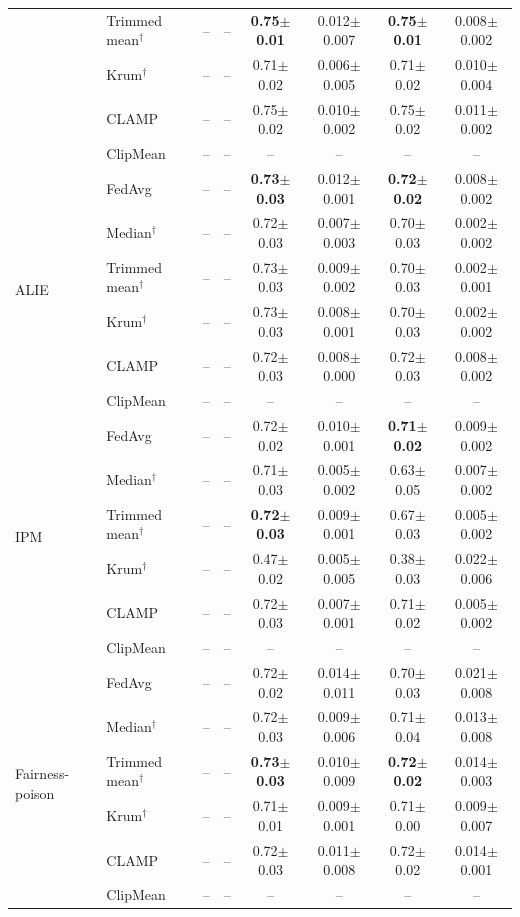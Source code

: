 \begin{table}[tbp]
\begin{tabular}{llcccccc}
 & Trimmed mean$^\dagger$ & -- & -- & \textbf{0.75$\pm$0.01} & 0.012$\pm$0.007 & \textbf{0.75$\pm$0.01} & 0.008$\pm$0.002 \\
 & Krum$^\dagger$ & -- & -- & 0.71$\pm$0.02 & 0.006$\pm$0.005 & 0.71$\pm$0.02 & 0.010$\pm$0.004 \\
 & CLAMP & -- & -- & 0.75$\pm$0.02 & 0.010$\pm$0.002 & 0.75$\pm$0.02 & 0.011$\pm$0.002 \\
 & ClipMean & -- & -- & -- & -- & -- & -- \\
\midrule
\multirow{6}{*}{ALIE} & FedAvg & -- & -- & \textbf{0.73$\pm$0.03} & 0.012$\pm$0.001 & \textbf{0.72$\pm$0.02} & 0.008$\pm$0.002 \\
 & Median$^\dagger$ & -- & -- & 0.72$\pm$0.03 & 0.007$\pm$0.003 & 0.70$\pm$0.03 & 0.002$\pm$0.002 \\
 & Trimmed mean$^\dagger$ & -- & -- & 0.73$\pm$0.03 & 0.009$\pm$0.002 & 0.70$\pm$0.03 & 0.002$\pm$0.001 \\
 & Krum$^\dagger$ & -- & -- & 0.73$\pm$0.03 & 0.008$\pm$0.001 & 0.70$\pm$0.03 & 0.002$\pm$0.002 \\
 & CLAMP & -- & -- & 0.72$\pm$0.03 & 0.008$\pm$0.000 & 0.72$\pm$0.03 & 0.008$\pm$0.002 \\
 & ClipMean & -- & -- & -- & -- & -- & -- \\
\midrule
\multirow{6}{*}{IPM} & FedAvg & -- & -- & 0.72$\pm$0.02 & 0.010$\pm$0.001 & \textbf{0.71$\pm$0.02} & 0.009$\pm$0.002 \\
 & Median$^\dagger$ & -- & -- & 0.71$\pm$0.03 & 0.005$\pm$0.002 & 0.63$\pm$0.05 & 0.007$\pm$0.002 \\
 & Trimmed mean$^\dagger$ & -- & -- & \textbf{0.72$\pm$0.03} & 0.009$\pm$0.001 & 0.67$\pm$0.03 & 0.005$\pm$0.002 \\
 & Krum$^\dagger$ & -- & -- & 0.47$\pm$0.02 & 0.005$\pm$0.005 & 0.38$\pm$0.03 & 0.022$\pm$0.006 \\
 & CLAMP & -- & -- & 0.72$\pm$0.03 & 0.007$\pm$0.001 & 0.71$\pm$0.02 & 0.005$\pm$0.002 \\
 & ClipMean & -- & -- & -- & -- & -- & -- \\
\midrule
\multirow{6}{*}{Fairness-poison} & FedAvg & -- & -- & 0.72$\pm$0.02 & 0.014$\pm$0.011 & 0.70$\pm$0.03 & 0.021$\pm$0.008 \\
 & Median$^\dagger$ & -- & -- & 0.72$\pm$0.03 & 0.009$\pm$0.006 & 0.71$\pm$0.04 & 0.013$\pm$0.008 \\
 & Trimmed mean$^\dagger$ & -- & -- & \textbf{0.73$\pm$0.03} & 0.010$\pm$0.009 & \textbf{0.72$\pm$0.02} & 0.014$\pm$0.003 \\
 & Krum$^\dagger$ & -- & -- & 0.71$\pm$0.01 & 0.009$\pm$0.001 & 0.71$\pm$0.00 & 0.009$\pm$0.007 \\
 & CLAMP & -- & -- & 0.72$\pm$0.03 & 0.011$\pm$0.008 & 0.72$\pm$0.02 & 0.014$\pm$0.001 \\
 & ClipMean & -- & -- & -- & -- & -- & -- \\
\bottomrule
\end{tabular}
\end{table}
